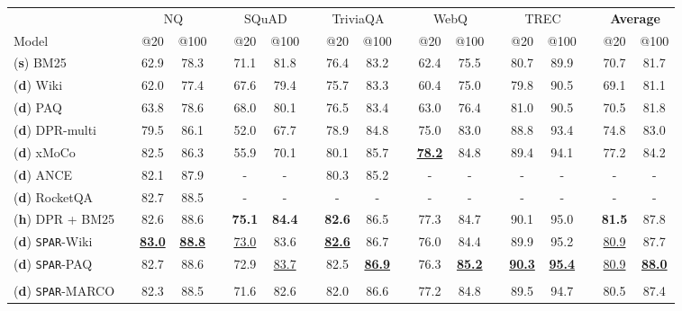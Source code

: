 \documentclass[11pt]{article}
\newcommand{\spar}{\texttt{SPAR}\xspace}
\newcommand{\lexmodelsymbol}{\xspace}
\newcommand{\secref}[1]{\S\ref{#1}}
\begin{document}
\begin{table*}[ht]
\setlength{\tabcolsep}{0.35em}
\small
\centering
\begin{threeparttable}
\begin{tabular} {l c cc c cc c cc c cc c cc c cc}
\toprule
   &&    \multicolumn{2}{c}{NQ} &&  \multicolumn{2}{c}{SQuAD} && \multicolumn{2}{c}{TriviaQA} &&  \multicolumn{2}{c}{WebQ} &&  \multicolumn{2}{c}{TREC}  && \multicolumn{2}{c}{\bf Average}\\
\cmidrule{3-4}\cmidrule{6-7}\cmidrule{9-10}\cmidrule{12-13}\cmidrule{15-16}\cmidrule{18-19}
Model    && @20  & @100 &&  @20  & @100   && @20  & @100   && @20  & @100   && @20  & @100   && @20  & @100  \\ 
\midrule
({\bf s}) BM25 && 62.9 & 78.3 && 71.1 & 81.8 && 76.4 & 83.2 && 62.4 & 75.5 && 80.7 & 89.9 &&  70.7 & 81.7 \\
\midrule
({\bf d}) Wiki \lexmodelsymbol{} && 62.0 & 77.4 && 67.6 & 79.4 && 75.7 & 83.3 && 60.4 & 75.0 && 79.8 & 90.5 && 69.1 & 81.1 \\
({\bf d}) PAQ \lexmodelsymbol{} && 63.8 & 78.6 && 68.0 & 80.1 && 76.5 & 83.4 && 63.0 & 76.4 && 81.0 & 90.5 && 70.5 & 81.8 \\
\midrule
({\bf d}) DPR-multi && 79.5 & 86.1 && 52.0 & 67.7 && 78.9 & 84.8 && 75.0 & 83.0 && 88.8 & 93.4 && 74.8 & 83.0 \\
({\bf d}) xMoCo\tnote{1} && 82.5 & 86.3 && 55.9 & 70.1 && 80.1 & 85.7 && \bf \underline{78.2} & 84.8 && 89.4 & 94.1 && 77.2 & 84.2 \\
({\bf d}) ANCE\tnote{2} && 82.1 & 87.9 && - & - && 80.3 & 85.2 && - & - && - & - && - & - \\
({\bf d}) RocketQA\tnote{3} && 82.7 & 88.5 && - & - && - & - && - & - && - & - && - & - \\

\midrule
({\bf h}) DPR + BM25\tnote{4} && 82.6 & 88.6 && \bf 75.1 & \bf 84.4 && \bf 82.6 & 86.5 && 77.3 & 84.7 && 90.1 & 95.0 && \bf 81.5 & 87.8 \\

\midrule
({\bf d}) \spar{}-Wiki && \bf \underline{83.0} & \bf \underline{88.8} && \underline{73.0} & 83.6 && \bf \underline{82.6} & 86.7 && 76.0 & 84.4 && 89.9 & 95.2 && \underline{80.9} & 87.7 \\
({\bf d}) \spar{}-PAQ && 82.7 & 88.6 && 72.9 & \underline{83.7} && 82.5 & \bf \underline{86.9} && 76.3 & \bf \underline{85.2} && \bf \underline{90.3} & \bf \underline{95.4} && \underline{80.9} & \bf \underline{88.0} \\
\specialrule{\heavyrulewidth}{\aboverulesep}{\belowrulesep}
\multicolumn{10}{l}{\small\emph{Cross-dataset model generalization (Discussed in \secref{sec:discussion:generalization})}}\\
({\bf d}) \spar{}-MARCO && 82.3 & 88.5 && 71.6 & 82.6 && 82.0 & 86.6 && 77.2 & 84.8 && 89.5 & 94.7 && 80.5 & 87.4 \\


\end{tabular}
\end{threeparttable}
\end{table*}
\end{document}
